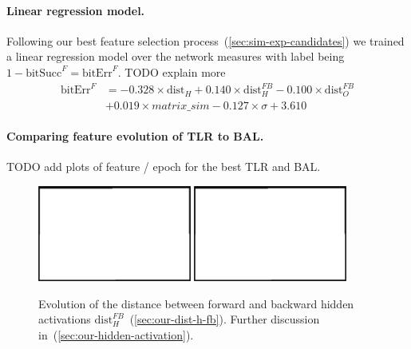 \paragraph{Linear regression model.} 

Following our best feature selection process~(\ref{sec:sim-exp-candidates}) we trained a linear regression model over the network measures with label being $1-\mbox{bitSucc}^F = \mbox{bitErr}^F$. TODO explain more 
\begin{align} 
\label{eq:results-candidates-linear-regression} 
\mbox{bitErr}^F &= 
- 0.328 \times \mbox{dist}_{H}
+ 0.140 \times \mbox{dist}_{H}^{FB}
- 0.100 \times \mbox{dist}_{O}^{FB} \nonumber \\
&+ 0.019 \times matrix\_sim
- 0.127 \times \sigma
+ 3.610
\end{align} 

\paragraph{Comparing feature evolution of TLR to BAL.} 

TODO add plots of feature / epoch for the best TLR and BAL. 

\begin{figure}[H]
  \centering
  \includegraphics[width=0.45\textwidth]{img/placeholder.png}  %
  \includegraphics[width=0.45\textwidth]{img/placeholder.png}  %
  \caption{Evolution of the distance between forward and backward hidden activations $\mbox{dist}_{H}^{FB}$~(\ref{sec:our-dist-h-fb}). Further discussion in~(\ref{sec:our-hidden-activation}). }
  \label{fig:results-candidates-dist-h-fb}
\end{figure}


